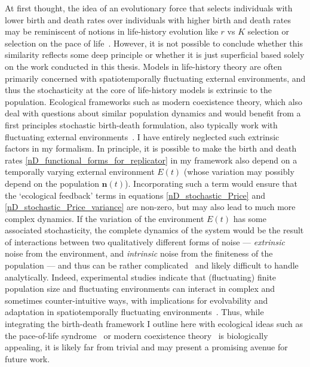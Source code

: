 At first thought, the idea of an evolutionary force that selects individuals with lower birth and death rates over individuals with higher birth and death rates may be reminiscent of notions in life-history evolution like $r$ vs $K$ selection or selection on the pace of life~\citep{stearns_evolution_1977}. However, it is not possible to conclude whether this similarity reflects some deep principle or whether it is just superficial based solely on the work conducted in this thesis. Models in life-history theory are often primarily concerned with spatiotemporally fluctuating external environments, and thus the stochasticity at the core of life-history models is extrinsic to the population. Ecological frameworks such as modern coexistence theory, which also deal with questions about similar population dynamics and would benefit from a first principles stochastic birth-death formulation, also typically work with fluctuating external environments~\citep{chesson_stabilizing_1982,chesson_multispecies_1994}. I have entirely neglected such extrinsic factors in my formalism. In principle, it is possible to make the birth and death rates \eqref{nD_functional_forms_for_replicator} in my framework also depend on a temporally varying external environment $E(t)$ (whose variation may possibly depend on the population $\mathbf{n}(t)$). Incorporating such a term would ensure that the `ecological feedback' terms in equations \eqref{nD_stochastic_Price} and \eqref{nD_stochastic_Price_variance} are non-zero, but may also lead to much more complex dynamics. If the variation of the environment $E(t)$ has some associated stochasticity, the complete dynamics of the system would be the result of interactions between two qualitatively different forms of noise --- \emph{extrinsic} noise from the environment, and \emph{intrinsic} noise from the finiteness of the population --- and thus can be rather complicated~\citep{gokhale_eco-evolutionary_2016} and likely difficult to handle analytically. Indeed, experimental studies indicate that (fluctuating) finite population size and fluctuating environments can interact in complex and sometimes counter-intuitive ways, with implications for evolvability and adaptation in spatiotemporally fluctuating environments~\citep{chavhan_larger_2020, chavhan_interplay_2021}. Thus, while integrating the birth-death framework I outline here with ecological ideas such as the pace-of-life syndrome~\citep{mathot_models_2018, wright_life-history_2019} or modern coexistence theory~\citep{chesson_multispecies_1994, johnson_resolving_2022} is biologically appealing, it is likely far from trivial and may present a promising avenue for future work.

